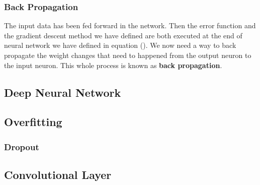\subsubsection{Back Propagation}
The input data has been fed forward in the network. Then the error function and the gradient descent method we have defined are both executed at the end of neural network we have defined in equation (). We now need a way to back propagate the weight changes that need to happened from the output neuron to the input neuron. This whole process is known as \textbf{back propagation}.
\subsection{Deep Neural Network}
\subsection{Overfitting}
\subsubsection{Dropout}
\subsection{Convolutional Layer}